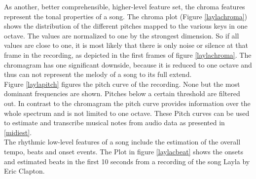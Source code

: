 As another, better comprehensible, higher-level feature set, the chroma features represent the tonal properties of a song. The chroma plot (Figure \ref{laylachroma}) shows the distribution of the different pitches mapped to the various keys in one octave. The values are normalized to one by the strongest dimension. So if all values are close to one, it is most likely that there is only noise or silence at that frame in the recording, as depicted in the first frames of figure \ref{laylachroma}. The chromagram has one significant downside, because it is reduced to one octave and thus can not represent the melody of a song to its full extend.\\
Figure \ref{laylapitch} figures the pitch curve of the recording. None but the most dominant frequencies are shown. Pitches below a certain threshold are filtered out. In contrast to the chromagram the pitch curve provides information over the whole spectrum and is not limited to one octave. These Pitch curves can be used to estimate and transcribe musical notes from audio data as presented in \ref{midiest}.\\
The rhythmic low-level features of a song include the estimation of the overall tempo, beats and onset events. 
The Plot in figure \ref{laylacbeat} shows the onsets and estimated beats in the first 10 seconds from a recording of the song Layla by Eric Clapton.

